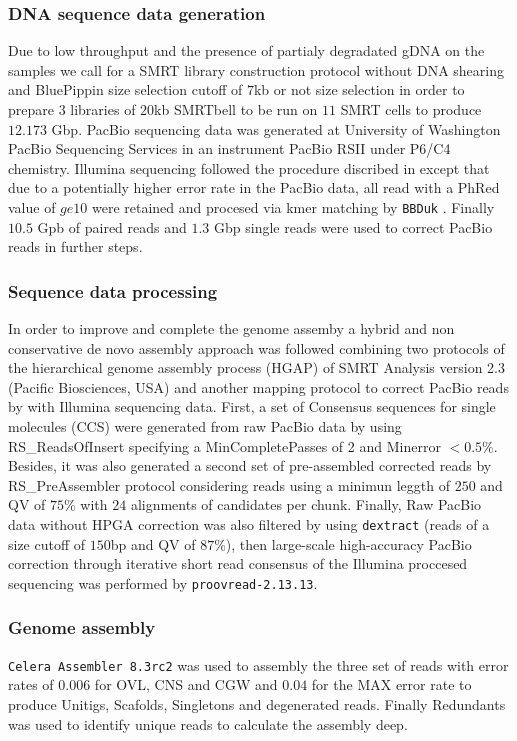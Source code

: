 \documentclass[11pt]{article}
\begin{document}
\subsubsection*{DNA sequence data generation}
Due to low throughput and the presence of partialy degradated gDNA on the
samples we call for a SMRT library construction protocol without DNA shearing
and BluePippin size selection cutoff of $7$kb or not size selection in order to
prepare $3$ libraries of $20$kb SMRTbell to be run on $11$ SMRT cells to produce
$12.173$ Gbp. PacBio sequencing data was generated at University of Washington
PacBio Sequencing Services in an instrument PacBio RSII under P6/C4 chemistry.
Illumina sequencing followed the procedure discribed in \cite{velandia2016a} except
that due to a potentially higher error rate in the PacBio data, all read with a
PhRed value of $ge 10$ were retained and procesed via kmer matching by \texttt{BBDuk} \cite{}.
Finally $10.5$ Gpb of paired reads and $1.3$ Gbp single reads were used to
correct PacBio reads in further steps.

\subsubsection*{Sequence data processing}
In order to improve and complete the genome assemby a hybrid and non
conservative de novo assembly approach was followed combining two protocols of
the hierarchical genome assembly process (HGAP) of SMRT Analysis version 2.3
(Pacific Biosciences, USA) and another mapping protocol to correct PacBio reads
by with Illumina sequencing data. First, a set of Consensus sequences for single
molecules (CCS) were generated from raw PacBio data by using RS\_ReadsOfInsert
specifying a MinCompletePasses of 2 and Minerror $< 0.5$\%. Besides, it was
also generated a second set of pre-assembled corrected reads by
RS\_PreAssembler protocol considering reads using a minimun leggth of $250$ and QV
of $75$\% with $24$ alignments of candidates per chunk. Finally, Raw PacBio data
without HPGA correction was also filtered by using \texttt{dextract} (reads of a
size cutoff of $150$bp and QV of $87$\%), then large-scale high-accuracy PacBio
correction through iterative short read consensus of the Illumina proccesed
sequencing was performed by \texttt{proovread-2.13.13}.
\subsubsection*{Genome assembly}
\texttt{Celera Assembler 8.3rc2} was used to assembly the three set of reads with error
rates of $0.006$ for OVL, CNS and CGW and $0.04$ for the MAX error rate to produce
Unitigs, Scafolds, Singletons and degenerated reads. Finally Redundants was used
to identify unique reads to calculate the assembly deep.
\end{document}
